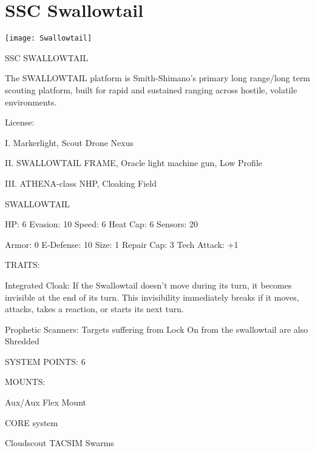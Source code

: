 \section{SSC Swallowtail}

\begin{center}
    \texttt{[image: Swallowtail]}
\end{center}


                                          SSC SWALLOWTAIL

The SWALLOWTAIL platform is Smith-Shimano’s primary long range/long term scouting platform,
built for rapid and sustained ranging across hostile, volatile environments.

                                                     License:





I. Markerlight, Scout Drone Nexus

II. SWALLOWTAIL FRAME,  Oracle light machine gun, Low Profile

III. ATHENA-class NHP, Cloaking Field


                                                SWALLOWTAIL

  HP: 6           Evasion: 10                            Speed: 6            Heat Cap: 6         Sensors: 20

  Armor: 0        E-Defense: 10                          Size: 1             Repair Cap: 3       Tech Attack:
                                                                                                 +1

                                                      TRAITS:

  Integrated Cloak: If the Swallowtail doesn’t move during its turn, it becomes invisible at the end of its
  turn. This invisibility immediately breaks if it moves, attacks, takes a reaction, or starts its next turn.

  Prophetic Scanners: Targets suffering from Lock On from the swallowtail are also Shredded

                                               SYSTEM POINTS: 6

                                                     MOUNTS:

  Aux/Aux                                                 Flex Mount

                                                   CORE system

                                          Cloudscout TACSIM Swarms

